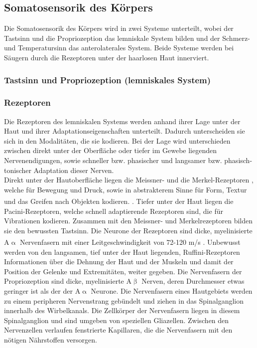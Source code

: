 \subsection{Somatosensorik  des Körpers}
Die Somatosensorik des Körpers wird in zwei Systeme unterteilt, wobei der Tastsinn  und die Propriozeption das lemniskale System  bilden und der Schmerz- und Temperatursinn das anterolaterales System.  Beide Systeme werden bei Säugern durch die Rezeptoren unter der haarlosen Haut innerviert.

\subsubsection{Tastsinn und Propriozeption (lemniskales System)} \label{subsubsec:tastsinn}

\subsubsection*{Rezeptoren}
Die Rezeptoren  des lemniskalen Systems werden anhand ihrer Lage unter der Haut und ihrer Adaptationseigenschaften unterteilt. Dadurch unterscheiden sie sich in den Modalitäten, die sie kodieren. Bei der Lage wird unterschieden zwischen direkt unter der Oberfläche oder tiefer im Gewebe liegenden Nervenendigungen, sowie schneller bzw. phasischer und langsamer bzw. phasisch-tonischer Adaptation dieser Nerven.\\
Direkt unter der Hautoberfläche liegen die Meissner- und die Merkel-Rezeptoren , welche für Bewegung und Druck, sowie in abstrakterem Sinne für Form, Textur und das Greifen nach Objekten kodieren.
\textsuperscript{\cite[Kap.~24]{paxinos2014rat}}. Tiefer unter der Haut liegen die Pacini-Rezeptoren, welche schnell adaptierende Rezeptoren sind, die für Vibrationen kodieren. Zusammen mit den Meissner- und Merkelrezeptoren bilden sie den bewussten Tastsinn. Die Neurone der Rezeptoren sind dicke, myelinisierte A$\upalpha$ Nervenfasern mit einer Leitgeschwindigkeit von 72-120 m/s \textsuperscript{\cite[Kap.~22]{kandel2013principles}}. Unbewusst werden von den langsamen, tief unter der Haut liegenden, Ruffini-Rezeptoren  Informationen über die Dehnung der Haut und der Muskeln und damit der Position der Gelenke und Extremitäten, weiter gegeben.
Die Nervenfasern der Propriozeption sind dicke, myelinisierte A$\upbeta$ Nerven, deren Durchmesser etwas geringer ist als der der A$\upalpha$ Neurone.
Die Nervenfasern eines Hautgebiets werden zu einem peripheren Nervenstrang gebündelt und ziehen in das Spinalganglion  innerhalb des Wirbelkanals. Die Zellkörper der Nervenfasern liegen in diesem Spinalganglion und sind umgeben von speziellen Gliazellen. Zwischen den Nervenzellen verlaufen fenstrierte Kapillaren, die die Nervenfasern mit den nötigen Nährstoffen versorgen. 

